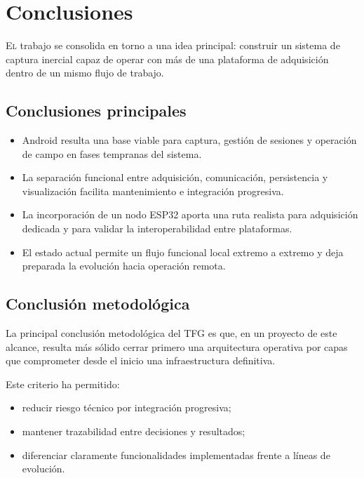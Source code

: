 \chapter{Conclusiones}
\label{chap:conclusions}

\lettrine{E}{l} trabajo se consolida en torno a una idea principal: construir un sistema de captura inercial capaz de operar con más de una plataforma de adquisición dentro de un mismo flujo de trabajo.

\section{Conclusiones principales}

\begin{itemize}
  \item Android resulta una base viable para captura, gestión de sesiones y operación de campo en fases tempranas del sistema.
  \item La separación funcional entre adquisición, comunicación, persistencia y visualización facilita mantenimiento e integración progresiva.
  \item La incorporación de un nodo ESP32 aporta una ruta realista para adquisición dedicada y para validar la interoperabilidad entre plataformas.
  \item El estado actual permite un flujo funcional local extremo a extremo y deja preparada la evolución hacia operación remota.
\end{itemize}

\section{Conclusión metodológica}

La principal conclusión metodológica del TFG es que, en un proyecto de este alcance, resulta más sólido cerrar primero una arquitectura operativa por capas que comprometer desde el inicio una infraestructura definitiva.

Este criterio ha permitido:

\begin{itemize}
  \item reducir riesgo técnico por integración progresiva;
  \item mantener trazabilidad entre decisiones y resultados;
  \item diferenciar claramente funcionalidades implementadas frente a líneas de evolución.
\end{itemize}

